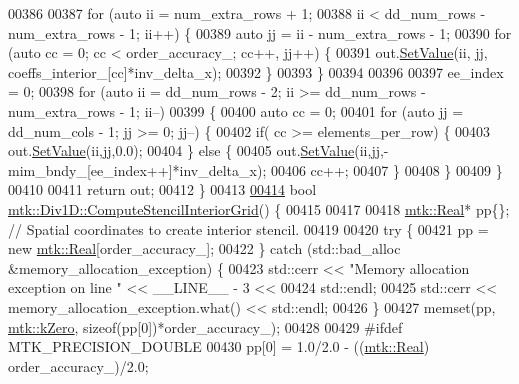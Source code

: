 \begin{DoxyCode}
{{00386 
00387   \textcolor{keywordflow}{for} (\textcolor{keyword}{auto} ii = num\_extra\_rows + 1;
00388        ii < dd\_num\_rows - num\_extra\_rows - 1; ii++) \{
00389     \textcolor{keyword}{auto} jj = ii - num\_extra\_rows - 1;
00390     \textcolor{keywordflow}{for} (\textcolor{keyword}{auto} cc = 0; cc < order\_accuracy\_; cc++, jj++) \{
00391       out.\hyperlink{classmtk_1_1DenseMatrix_a784ce5784109ac86bfb9d8562b334b13}{SetValue}(ii, jj, coeffs\_interior\_[cc]*inv\_delta\_x);
00392     \}
00393   \}
00394 
00396 
00397   ee\_index = 0;
00398   \textcolor{keywordflow}{for} (\textcolor{keyword}{auto} ii = dd\_num\_rows - 2; ii >= dd\_num\_rows - num\_extra\_rows - 1; ii--)
00399 \{
00400     \textcolor{keyword}{auto} cc = 0;
00401     \textcolor{keywordflow}{for} (\textcolor{keyword}{auto} jj = dd\_num\_cols - 1; jj >= 0; jj--) \{
00402       \textcolor{keywordflow}{if}( cc >= elements\_per\_row) \{
00403         out.\hyperlink{classmtk_1_1DenseMatrix_a784ce5784109ac86bfb9d8562b334b13}{SetValue}(ii,jj,0.0);
00404       \} \textcolor{keywordflow}{else} \{
00405         out.\hyperlink{classmtk_1_1DenseMatrix_a784ce5784109ac86bfb9d8562b334b13}{SetValue}(ii,jj,-mim\_bndy\_[ee\_index++]*inv\_delta\_x);
00406         cc++;
00407       \}
00408      \}
00409   \}
00410 
00411   \textcolor{keywordflow}{return} out;
00412 \}
00413 
\hypertarget{mtk__div__1d_8cc_source_l00414}{}\hyperlink{classmtk_1_1Div1D_a3eb3a32862a6b066cd583cbbd00a6509}{00414} \textcolor{keywordtype}{bool} \hyperlink{classmtk_1_1Div1D_a3eb3a32862a6b066cd583cbbd00a6509}{mtk::Div1D::ComputeStencilInteriorGrid}() \{
00415 
00417 
00418   \hyperlink{group__c01-roots_gac080bbbf5cbb5502c9f00405f894857d}{mtk::Real}* pp\{\}; \textcolor{comment}{// Spatial coordinates to create interior stencil.}
00419 
00420   \textcolor{keywordflow}{try} \{
00421     pp = \textcolor{keyword}{new} \hyperlink{group__c01-roots_gac080bbbf5cbb5502c9f00405f894857d}{mtk::Real}[order\_accuracy\_];
00422   \} \textcolor{keywordflow}{catch} (std::bad\_alloc &memory\_allocation\_exception) \{
00423     std::cerr << \textcolor{stringliteral}{"Memory allocation exception on line "} << \_\_LINE\_\_ - 3 <<
00424       std::endl;
00425     std::cerr << memory\_allocation\_exception.what() << std::endl;
00426   \}
00427   memset(pp, \hyperlink{group__c01-roots_ga59a451a5fae30d59649bcda274fea271}{mtk::kZero}, \textcolor{keyword}{sizeof}(pp[0])*order\_accuracy\_);
00428 
00429 \textcolor{preprocessor}{  #ifdef MTK\_PRECISION\_DOUBLE}
00430   pp[0] = 1.0/2.0 - ((\hyperlink{group__c01-roots_gac080bbbf5cbb5502c9f00405f894857d}{mtk::Real}) order\_accuracy\_)/2.0;
}}
\end{DoxyCode}
